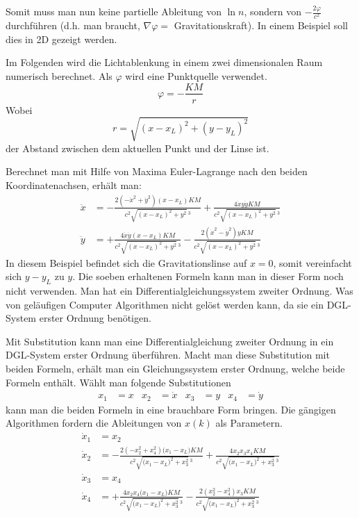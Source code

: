\begin{refsection}
Somit muss man nun keine partielle Ableitung von \(\ln n\), sondern von
\(-\frac{2\varphi}{c^2}\) durchführen (d.h. man braucht,
\(\nabla\varphi=\) Gravitationskraft).  In einem Beispiel soll dies in
2D gezeigt werden.

\begin{beispiel}
  Im Folgenden wird die Lichtablenkung in einem zwei dimensionalen
  Raum numerisch berechnet.  Als \(\varphi\) wird eine Punktquelle
  verwendet.
  \begin{equation*}
    \varphi = -\frac{KM}{r}
  \end{equation*}
  Wobei
  \begin{equation*}
    r = \sqrt{(x-x_L)^2+(y-y_L)^2}
  \end{equation*}
  der Abstand zwischen dem aktuellen Punkt und der Linse ist.

  Berechnet man mit Hilfe von Maxima Euler-Lagrange nach den beiden
  Koordinatenachsen, erhält man:
  \begin{align*}
    \ddot{x} &= -\frac{2(-\dot{x}^2+\dot{y}^2)(x-x_L)KM}
               {c^2\sqrt{(x-x_L)^2+y^2}\,^3}+
               \frac{4\dot{x}y\dot{y}KM}{c^2\sqrt{(x-x_L)^2+y^2}\,^3}\\
    \ddot{y} &= +\frac{4\dot{x}\dot{y}(x-x_L)KM}{c^2\sqrt{(x-x_L)^2+y^2}\,^3}
               - \frac{2(\dot{x}^2-\dot{y}^2)yKM}
               {c^2\sqrt{(x-x_L)^2+y^2}\,^3}
  \end{align*}
  In diesem Beispiel befindet sich die Gravitationslinse auf \(x=0\),
  somit vereinfacht sich \(y-y_L\) zu \(y\).  Die soeben erhaltenen
  Formeln kann man in dieser Form noch nicht verwenden.  Man hat ein
  Differentialgleichungssystem zweiter Ordnung.  Was von geläufigen
  Computer Algorithmen nicht gelöst werden kann, da sie ein DGL-System
  erster Ordnung benötigen.

  Mit Substitution kann man eine Differentialgleichung zweiter Ordnung
  in ein DGL-System erster Ordnung überführen.  Macht man diese
  Substitution mit beiden Formeln, erhält man ein Gleichungssystem
  erster Ordnung, welche beide Formeln enthält.  Wählt man folgende
  Substitutionen
  \begin{align*}
    x_1 &= x &x_2 &= \dot{x} &x_3 &= y &x_4 &= \dot{y}
  \end{align*}
  kann man die beiden Formeln in eine brauchbare Form bringen.  Die
  gängigen Algorithmen fordern die Ableitungen von \(x(k)\) als
  Parametern.
  \begin{align*}
    \dot{x}_1 &= x_2\\
    \dot{x}_2 &= -\frac{2\left(-x_2^2+x_4^2\right)\bigl(x_1-x_L\bigr)KM}
                {c^2\sqrt{\bigl(x_1-x_L\bigr)^2+x_3^2}\,^3}
                + \frac{4 x_2x_3x_4 KM}
                {c^2\sqrt{\bigl(x_1-x_L\bigr)^2+x_3^2}\,^3}\\
    \dot{x}_3 &= x_4\\
    \dot{x}_4 &= +\frac{4x_2x_4\bigl(x_1-x_L\bigr)KM}
                {c^2\sqrt{\bigl(x_1-x_L\bigr)^2+x_3^2}\,^3}
                - \frac{2 \left(x_2^2-x_4^2\right) x_3 KM}
                {c^2\sqrt{\bigl(x_1-x_L\bigr)^2+x_3^2}\,^3}
  \end{align*}


\end{beispiel}
\end{refsection}

